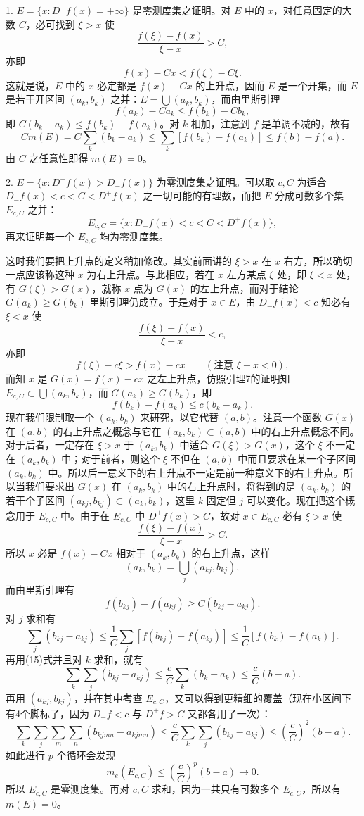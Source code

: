 1. $E=\{x:D^+f(x)=+\infty\}$ 是零测度集之证明。对 $E$ 中的 $x$，对任意固定的大数 $C$，必可找到 $\xi>x$ 使
\[
 \frac{f(\xi)-f(x)}{\xi-x}>C,
\]
亦即
\[
 f(x)-Cx<f(\xi)-C\xi.
\]
这就是说，$E$ 中的 $x$ 必定都是 $f(x)-Cx$ 的上升点，因而 $E$ 是一个开集，而 $E$ 是若干开区间 $(a_k,b_k)$ 之并：$E=\bigcup(a_k,b_k)$，而由里斯引理
\[
 f(a_k)-Ca_k\le f(b_k)-Cb_k,
\]
即 $C(b_k-a_k)\le f(b_k)-f(a_k)$。对 $k$ 相加，注意到 $f$ 是单调不减的，故有
\[
 Cm(E)=C\sum_k(b_k-a_k)\le\sum_k[f(b_k)-f(a_k)]\le f(b)-f(a).
\]
由 $C$ 之任意性即得 $m(E)=0$。

2. $E=\{x:D^+f(x)>D_-f(x)\}$ 为零测度集之证明。可以取 $c,C$ 为适合 $D_-f(x)<c<C<D^+f(x)$ 之一切可能的有理数，而把 $E$ 分成可数多个集 $E_{c,C}$ 之并：
\[
 E_{c,C}=\{x:D_-f(x)<c<C<D^+f(x)\},
\]
再来证明每一个 $E_{c,C}$ 均为零测度集。

这时我们要把上升点的定义稍加修改。其实前面讲的 $\xi>x$ 在 $x$ 右方，所以确切一点应该称这种 $x$ 为右上升点。与此相应，若在 $x$ 左方某点 $\xi$ 处，即 $\xi<x$ 处，有 $G(\xi)>G(x)$，就称 $x$ 点为 $G(x)$ 的左上升点，而对于结论 $G(a_k)\ge G(b_k)$ 里斯引理仍成立。于是对于 $x\in E$，由 $D_-f(x)<c$ 知必有 $\xi<x$ 使
\[
 \frac{f(\xi)-f(x)}{\xi-x}<c,
\]
亦即
\[
 f(\xi)-c\xi>f(x)-cx\qquad(\text{注意 }\xi-x<0),
\]
而知 $x$ 是 $G(x)=f(x)-cx$ 之左上升点，仿照引理7的证明知 $E_{c,C}\subset\bigcup(a_k,b_k)$，而 $G(a_k)\ge G(b_k)$，即
\begin{equation}
 f(b_k)-f(a_k)\le c(b_k-a_k).
 \tag{15}
\end{equation}
现在我们限制取一个 $(a_k,b_k)$ 来研究，以它代替 $(a,b)$。注意一个函数 $G(x)$ 在 $(a,b)$ 的右上升点之概念与它在 $(a_k,b_k)\subset(a,b)$ 中的右上升点概念不同。对于后者，一定存在 $\xi>x$ 于 $(a_k,b_k)$ 中适合 $G(\xi)>G(x)$，这个 $\xi$ 不一定在 $(a_k,b_k)$ 中；对于前者，则这个 $\xi$ 不但在 $(a,b)$ 中而且要求在某一个子区间 $(a_k,b_k)$ 中。所以后一意义下的右上升点不一定是前一种意义下的右上升点。所以当我们要求出 $G(x)$ 在 $(a_k,b_k)$ 中的右上升点时，将得到的是 $(a_k,b_k)$ 的若干个子区间 $(a_{kj},b_{kj})\subset(a_k,b_k)$，这里 $k$ 固定但 $j$ 可以变化。现在把这个概念用于 $E_{c,C}$ 中。由于在 $E_{c,C}$ 中 $D^+f(x)>C$，故对 $x\in E_{c,C}$ 必有 $\xi>x$ 使
\[
 \frac{f(\xi)-f(x)}{\xi-x}>C.
\]
所以 $x$ 必是 $f(x)-Cx$ 相对于 $(a_k,b_k)$ 的右上升点，这样
\[
 (a_k,b_k)=\bigcup_j(a_{kj},b_{kj}),
\]
而由里斯引理有
\[
 f(b_{kj})-f(a_{kj})\ge C(b_{kj}-a_{kj}).
\]
对 $j$ 求和有
\[
 \sum_j(b_{kj}-a_{kj})\le\frac1C\sum_j[f(b_{kj})-f(a_{kj})]
 \le\frac1C[f(b_k)-f(a_k)].
\]
再用(15)式并且对 $k$ 求和，就有
\begin{equation}
 \sum_k\sum_j(b_{kj}-a_{kj})\le\frac{c}{C}\sum_k(b_k-a_k)
 \le\frac{c}{C}(b-a).
 \tag{16}
\end{equation}
再用 $(a_{kj},b_{kj})$，并在其中考查 $E_{c,C}$，又可以得到更精细的覆盖（现在小区间下有4个脚标了，因为 $D_-f<c$ 与 $D^+f>C$ 又都各用了一次）：
\[
 \sum_k\sum_j\sum_m\sum_n(b_{kjmn}-a_{kjmn})
 \le\frac{c}{C}\sum_k\sum_j(b_{kj}-a_{kj})
 \le\left(\frac{c}{C}\right)^2(b-a).
\]
如此进行 $p$ 个循环会发现
\begin{equation}
 m_e(E_{c,C})\le\left(\frac{c}{C}\right)^p(b-a)\to0.
 \tag{17}
\end{equation}
所以 $E_{c,C}$ 是零测度集。再对 $c,C$ 求和，因为一共只有可数多个 $E_{c,C}$，所以有 $m(E)=0$。

